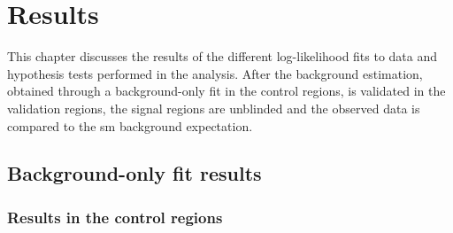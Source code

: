 

\chapter{Results}\label{ch:results}

\ifpdf
    \graphicspath{{chapter-results/Figs/Raster/}{chapter-results/Figs/PDF/}{chapter-results/Figs/}}
\else
    \graphicspath{{chapter-results/Figs/Vector/}{chapter-results/Figs/}}
\fi

This chapter discusses the results of the different log-likelihood fits to data and hypothesis tests performed in the analysis. After the background estimation, obtained through a background-only fit in the control regions, is validated in the validation regions, the signal regions are unblinded and the observed data is compared to the \gls{sm} background expectation.

\section{Background-only fit results}\label{sec:results_background_only}

\subsection{Results in the control regions}

